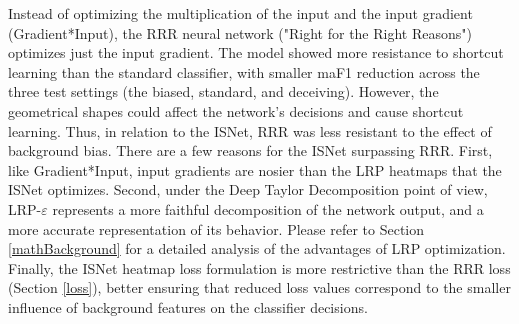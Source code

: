 \documentclass[fleqn,10pt]{wlscirep}
\begin{document}
{Instead of optimizing the multiplication of the input and the input gradient (Gradient*Input), the RRR neural network ("Right for the Right Reasons") optimizes just the input gradient\cite{RRR}. The model showed more resistance to shortcut learning than the standard classifier, with smaller maF1 reduction across the three test settings (the biased, standard, and deceiving). However, the geometrical shapes could affect the network's decisions and cause shortcut learning. Thus, in relation to the ISNet, RRR was less resistant to the effect of background bias. There are a few reasons for the ISNet surpassing RRR. First, like Gradient*Input, input gradients are nosier than the LRP heatmaps that the ISNet optimizes. Second, under the Deep Taylor Decomposition point of view, LRP-$\varepsilon$ represents a more faithful decomposition of the network output, and a more accurate representation of its behavior. Please refer to Section \ref{mathBackground} for a detailed analysis of the advantages of LRP optimization. Finally, the ISNet heatmap loss formulation is more restrictive than the RRR loss (Section \ref{loss}), better ensuring that reduced loss values correspond to the smaller influence of background features on the classifier decisions.

}
\end{document}

